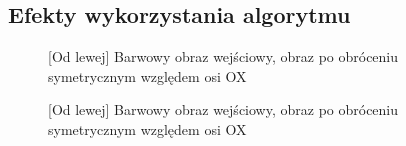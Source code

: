 \documentclass[a4paper,12pt, titlepage]{report}
\begin{document}
\subsection*{Efekty wykorzystania algorytmu}
\begin{figure}[h]
    \centering
    \caption{[Od lewej] Barwowy obraz wejściowy, obraz po obróceniu symetrycznym względem osi OX}%
    \label{fig:rysunek}%
\end{figure}
\FloatBarrier
\begin{figure}[h]
    \centering
    \caption{[Od lewej] Barwowy obraz wejściowy, obraz po obróceniu symetrycznym względem osi OX}%
    \label{fig:rysunek}%
\end{figure}
\FloatBarrier
\end{document}
